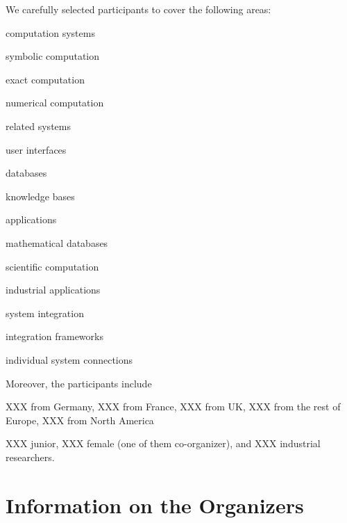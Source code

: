 \documentclass[a4paper,11pt]{article}
\begin{document}

\noindent
We carefully selected participants to cover the following areas:
\begin{compactitem}
\item computation systems
  \begin{compactitem}
    \item symbolic computation
    \item exact computation
    \item numerical computation
  \end{compactitem}
\item related systems
  \begin{compactitem}
    \item user interfaces
    \item databases
    \item knowledge bases
  \end{compactitem}
\item applications
  \begin{compactitem}
    \item mathematical databases
    \item scientific computation
    \item industrial applications
  \end{compactitem}
\item system integration
  \begin{compactitem}
    \item integration frameworks
    \item individual system connections
  \end{compactitem}
\end{compactitem}
\medskip

\noindent
Moreover, the participants include
\begin{compactitem}
\item XXX from Germany, XXX from France, XXX from UK, XXX from the rest of Europe, XXX from North America
\item XXX junior, XXX female (one of them co-organizer), and XXX industrial researchers.
\end{compactitem}

\section{Information on the Organizers}
\end{document}
